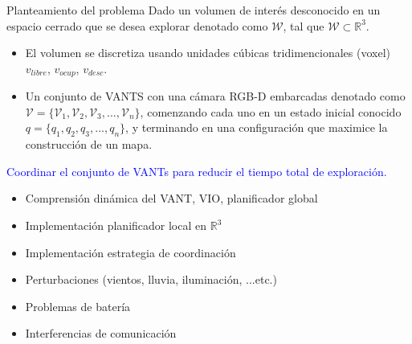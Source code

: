 \documentclass[24pt,aspectratio=169]{beamer}
\newcommand{\cmark}{{\color{green}\ding{51}}} %
\newcommand{\xmark}{{\color{red}\ding{55}}}   %
\begin{document}
\begin{frame}[fragile]{Planteamiento del problema}
  \vspace{1mm}
  \centering
  \justifying
  \footnotesize Dado un volumen de interés desconocido en un espacio cerrado que se desea explorar denotado como $\mathcal{W}$, tal que $\mathcal{W} \subset \mathbb{R}^{3}$.\\
  \begin{itemize}
  \item El volumen se discretiza usando unidades cúbicas tridimencionales (voxel) $v_{libre}$, $v_{ocup}$, $v_{desc}$.
  \item Un conjunto de VANTS con una cámara RGB-D embarcadas denotado como $\mathcal{V} = \{\mathcal{V}_{1},\mathcal{V}_{2},\mathcal{V}_{3},...,\mathcal{V}_{n}\}$, comenzando cada uno en un estado inicial conocido $q = \{q_{1},q_{2},q_{3},...,q_{n}\}$, y terminando en una configuración que maximice la construcción de un mapa.\\
  \end{itemize}

  \begin{center}
    \textcolor{blue}{Coordinar el conjunto de VANTs para reducir el tiempo total de exploración.}
  \end{center}
  
  \begin{multicols}{2}
    \begin{itemize}[label={}]
    \item \cmark { }Comprensión dinámica del VANT, VIO, planificador global
    \item \cmark { }Implementación planificador local en $\mathbb{R}^{3}$
    \item \cmark { }Implementación estrategia de coordinación
    \end{itemize}
    
    
    \begin{itemize}[label={}]
    \item \xmark { }Perturbaciones (vientos, lluvia, iluminación, ...etc.)
    \item \xmark { }Problemas de batería
    \item \xmark { }Interferencias de comunicación
    \end{itemize}
  \end{multicols}
  

\end{frame}
\end{document}
